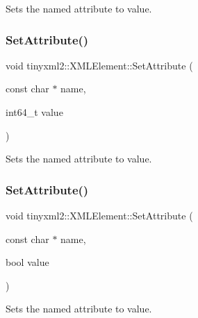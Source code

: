 Sets the named attribute to value. 

\mbox{\label{classtinyxml2_1_1_x_m_l_element_aaeefdf9171fec91b13a776b42299b0dd}} 
\subsubsection{\texorpdfstring{Set\+Attribute()}{SetAttribute()}\hspace{0.1cm}{\footnotesize\ttfamily [4/7]}}
{\footnotesize\ttfamily void tinyxml2\+::\+X\+M\+L\+Element\+::\+Set\+Attribute (\begin{DoxyParamCaption}\item[{const char $\ast$}]{name,  }\item[{int64\+\_\+t}]{value }\end{DoxyParamCaption})\hspace{0.3cm}{\ttfamily [inline]}}



Sets the named attribute to value. 

\mbox{\label{classtinyxml2_1_1_x_m_l_element_aa848b696e6a75e4e545c6da9893b11e1}} 
\subsubsection{\texorpdfstring{Set\+Attribute()}{SetAttribute()}\hspace{0.1cm}{\footnotesize\ttfamily [5/7]}}
{\footnotesize\ttfamily void tinyxml2\+::\+X\+M\+L\+Element\+::\+Set\+Attribute (\begin{DoxyParamCaption}\item[{const char $\ast$}]{name,  }\item[{bool}]{value }\end{DoxyParamCaption})\hspace{0.3cm}{\ttfamily [inline]}}



Sets the named attribute to value. 

